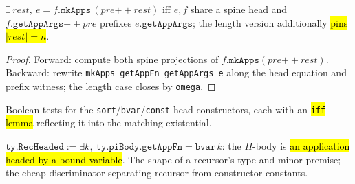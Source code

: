 \begin{theorem}
\label{thm:eq-mkapps-append}
\leanok
{} 

 $\exists\,\mathit{rest},\ e = f.\texttt{mkApps}\,(\mathit{pre} \mathbin{+\!\!+} \mathit{rest})$
iff $e,f$ share a spine head and $f.\texttt{getAppArgs} \mathbin{+\!\!+} \mathit{pre}$
prefixes $e.\texttt{getAppArgs}$; the length version additionally \hl{pins
$|\mathit{rest}|=n$}.
\end{theorem}
\begin{proof}
\leanok
{} Forward: compute both spine projections of
$f.\texttt{mkApps}(\mathit{pre}{+\!\!+}\mathit{rest})$. Backward: rewrite
\texttt{mkApps\_getAppFn\_getAppArgs e} along the head equation and prefix witness; the
length case closes by \texttt{omega}.
\end{proof}

\begin{definition}
\label{def:head-tests}
\leanok
{} 

 Boolean tests for the \texttt{sort}/\texttt{bvar}/\texttt{const} head
constructors, each with an \hl{\texttt{iff} lemma} reflecting it into the matching
existential.
\end{definition}

\begin{definition}
\label{def:recheaded}
\leanok
{} 

 $\texttt{ty.RecHeaded} := \exists k,\ \texttt{ty.piBody.getAppFn} = \texttt{bvar}\,k$:
the $\Pi$-body is \hl{an application headed by a bound variable}.
The shape of a recursor's type and minor premise; the cheap discriminator
separating recursor from constructor constants.
\end{definition}

